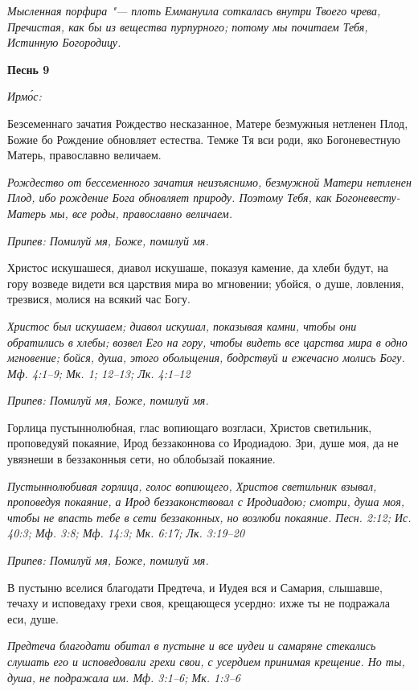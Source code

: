 \itshape Мысленная порфира "--- плоть Еммануила соткалась внутри Твоего чрева, Пречистая, как бы из вещества пурпурного; потому мы почитаем Тебя, Истинную Богородицу.\normalfont{}





\bfseries Песнь 9\normalfont{}


\itshape Ирмо́с:\normalfont{}


Безсеменнаго зачатия Рождество несказанное, Матере безмужныя нетленен Плод, Божие бо Рождение обновляет естества. Темже Тя вси роди, яко Богоневестную Матерь, православно величаем.


\itshape Рождество от бессеменного зачатия неизъяснимо, безмужной Матери нетленен Плод, ибо рождение Бога обновляет природу. Поэтому Тебя, как Богоневесту-Матерь мы, все роды, православно величаем.\normalfont{}


\itshape Припев:\normalfont{} Помилуй мя, Боже, помилуй мя.


Христос искушашеся, диавол искушаше, показуя камение, да хлеби будут, на гору возведе видети вся царствия мира во мгновении; убойся, о душе, ловления, трезвися, молися на всякий час Богу.


\itshape Христос был искушаем; диавол искушал, показывая камни, чтобы они обратились в хлебы; возвел Его на гору, чтобы видеть все царства мира в одно мгновение; бойся, душа, этого обольщения, бодрствуй и ежечасно молись Богу. Мф. 4:1–9; Мк. 1; 12–13; Лк. 4:1–12\normalfont{}


\itshape Припев:\normalfont{} Помилуй мя, Боже, помилуй мя.


Горлица пустыннолюбная, глас вопиющаго возгласи, Христов светильник, проповедуяй покаяние, Ирод беззаконнова со Иродиадою. Зри, душе моя, да не увязнеши в беззаконныя сети, но облобызай покаяние.


\itshape Пустыннолюбивая горлица, голос вопиющего, Христов светильник взывал, проповедуя покаяние, а Ирод беззаконствовал с Иродиадою; смотри, душа моя, чтобы не впасть тебе в сети беззаконных, но возлюби покаяние. Песн. 2:12; Ис. 40:3; Мф. 3:8; Мф. 14:3; Мк. 6:17; Лк. 3:19–20\normalfont{}


\itshape Припев:\normalfont{} Помилуй мя, Боже, помилуй мя.


В пустыню вселися благодати Предтеча, и Иудея вся и Самария, слышавше, течаху и исповедаху грехи своя, крещающеся усердно: ихже ты не подражала еси, душе.


\itshape Предтеча благодати обитал в пустыне и все иудеи и самаряне стекались слушать его и исповедовали грехи свои, с усердием принимая крещение. Но ты, душа, не подражала им. Мф. 3:1–6; Мк. 1:3–6\normalfont{}


